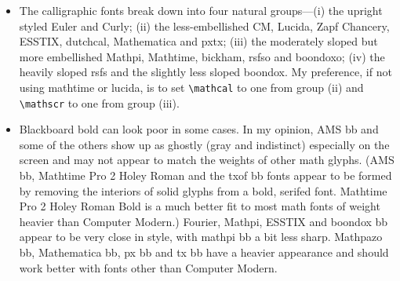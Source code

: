 \documentclass[11pt]{article}
\begin{document}
\begin{itemize}
\item The calligraphic fonts break down into four natural groups---(i) the upright styled \textsf{Euler} and \textsf{Curly}; (ii) the less-embellished \textsf{CM, Lucida, Zapf Chancery, ESSTIX, dutchcal,  Mathematica} and \textsf{pxtx}; (iii) the moderately sloped but more embellished {Mathpi, Mathtime, bickham, rsfso} and \textsf{boondoxo}; (iv) the heavily sloped rsfs and the slightly less sloped boondox. My preference, if not using \textsf{mathtime} or \textsf{lucida}, is to set \verb|\mathcal| to one from group (ii) and \verb|\mathscr| to one from group (iii).
    \item Blackboard bold can look poor in some cases. In my opinion, \textsf{AMS} bb and some of the others show up as ghostly (gray and indistinct) especially on the screen and may not appear to match the weights of other math glyphs. (\textsf{AMS bb, Mathtime Pro 2 Holey Roman} and the \textsf{txof} bb fonts appear to be formed by removing the interiors of solid glyphs from a bold, serifed font. \textsf{Mathtime Pro 2 Holey Roman Bold} is a much better fit to most math fonts of weight heavier than \textsf{Computer Modern}.) \textsf{Fourier,  Mathpi, ESSTIX} and \textsf{boondox} bb appear to be very close in style, with \textsf{mathpi} bb a bit less sharp. \textsf{Mathpazo bb, Mathematica bb, px bb} and \textsf{tx bb} have a heavier appearance and should work better with fonts other than \textsf{Computer Modern}.
\end{itemize}
\end{document}
